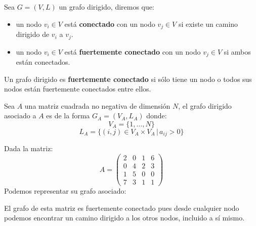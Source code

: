 \begin{definition}
    Sea $G=(V,L)$ un grafo dirigido, diremos que:
    \begin{itemize}
        \item un nodo $v_i\in V$ está \textbf{conectado} con un nodo $v_j\in V$ si existe un camino dirigido de $v_i$ a $v_j$.
        \item un nodo $v_i\in V$ está \textbf{fuertemente conectado} con un nodo $v_j\in V$ si ambos están conectados.
    \end{itemize}
    Un grafo dirigido es \textbf{fuertemente conectado} si sólo tiene un nodo o todos sus nodos están fuertemente conectados entre ellos.
\end{definition}

\begin{definition}
    Sea $A$ una matriz cuadrada no negativa de dimensión $N$, el grafo dirigido asociado a $A$ es de la forma $G_A=(V_A,L_A)$ donde:
    \[V_A=\{1,\dots,N\}\] 
    \[L_A=\{(i,j)\in V_A\times V_A \,|\, a_{ij}>0\}\]
\end{definition}

\begin{exampleth}
    Dada la matriz:
    \[A=\begin{pmatrix}
        2 & 0 & 1 & 6 \\
        0 & 4 & 2 & 3 \\
        1 & 5 & 0 & 0 \\
        7 & 3 & 1 & 1 
    \end{pmatrix}\]
    Podemos representar su grafo asociado:
    \begin{center}
    \end{center}
    El grafo de esta matriz es fuertemente conectado pues desde cualquier nodo podemos encontrar un camino dirigido a los otros nodos, incluido a sí mismo.
\end{exampleth}


